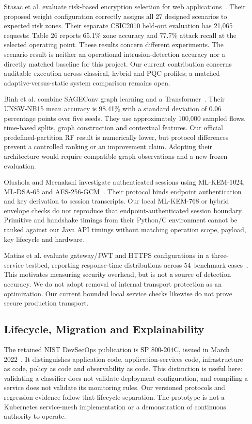 \documentclass[conference,a4paper]{IEEEtran}
\begin{document}
Stasac et al. evaluate risk-based encryption selection for web applications~\cite{adaptive}. Their proposed weight configuration correctly assigns all 27 designed scenarios to expected risk zones. Their separate CSIC2010 held-out evaluation has 21,065 requests: Table 26 reports 65.1\% zone accuracy and 77.7\% attack recall at the selected operating point. These results concern different experiments. The scenario result is neither an operational intrusion-detection accuracy nor a directly matched baseline for this project. Our current contribution concerns auditable execution across classical, hybrid and PQC profiles; a matched adaptive-versus-static system comparison remains open.

Binh et al. combine SAGEConv graph learning and a Transformer~\cite{sage}. Their UNSW-NB15 mean accuracy is 98.41\% with a standard deviation of 0.06 percentage points over five seeds. They use approximately 100,000 sampled flows, time-based splits, graph construction and contextual features. Our official predefined-partition RF result is numerically lower, but protocol differences prevent a controlled ranking or an improvement claim. Adopting their architecture would require compatible graph observations and a new frozen evaluation.

Olushola and Meenakshi investigate authenticated sessions using ML-KEM-1024, ML-DSA-65 and AES-256-GCM~\cite{session}. Their protocol binds endpoint authentication and key derivation to session transcripts. Our local ML-KEM-768 or hybrid envelope checks do not reproduce that endpoint-authenticated session boundary. Primitive and handshake timings from their Python/C environment cannot be ranked against our Java API timings without matching operation scope, payload, key lifecycle and hardware.

Matias et al. evaluate gateway/JWT and HTTPS configurations in a three-service testbed, reporting response-time distributions across 54 benchmark cases~\cite{gateway}. This motivates measuring security overhead, but is not a source of detection accuracy. We do not adopt removal of internal transport protection as an optimization. Our current bounded local service checks likewise do not prove secure production transport.

\subsection{Lifecycle, Migration and Explainability}
The retained NIST DevSecOps publication is SP 800-204C, issued in March 2022~\cite{devsecops}. It distinguishes application code, application-services code, infrastructure as code, policy as code and observability as code. This distinction is useful here: validating a classifier does not validate deployment configuration, and compiling a service does not validate its monitoring rules. Our versioned protocols and regression evidence follow that lifecycle separation. The prototype is not a Kubernetes service-mesh implementation or a demonstration of continuous authority to operate.
\end{document}
